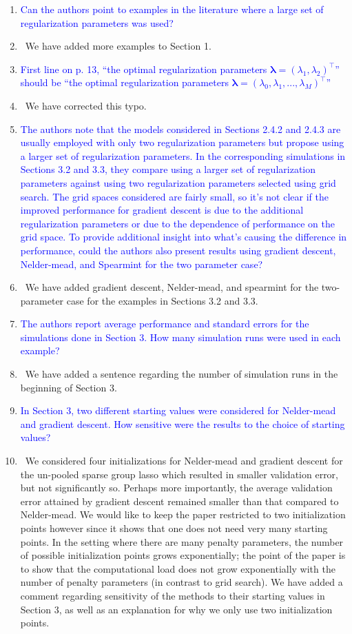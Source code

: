 \documentclass[]{article}
\newcommand{\point}[1]{\item \textcolor{blue}{#1}}
\newcommand{\reply}{\item[]\ }
\begin{document}
	\begin{enumerate}
		\point{Can the authors point to examples in the literature where a large set of regularization parameters was used?}
		
		\reply We have added more examples to Section 1.
		
		\point{First line on p. 13, ``the optimal regularization parameters $\boldsymbol{\lambda} = (\lambda_1,\lambda_2)^\top$'' should be ``the optimal regularization parameters $\boldsymbol{\lambda} = (\lambda_0, \lambda_1, ... , \lambda_M)^\top$''}
		
		\reply We have corrected this typo.
		
		\point{The authors note that the models considered in Sections 2.4.2 and 2.4.3 are usually employed with only two regularization parameters but propose using a larger set of regularization parameters. In the corresponding simulations in Sections 3.2 and 3.3, they compare using a larger set of regularization parameters against using two regularization parameters selected using grid search. The grid spaces considered are fairly small, so it’s not clear if the improved performance for gradient descent is due to the additional regularization parameters or due to the dependence of performance on the grid space. To provide additional insight into what’s causing the difference in performance, could the authors also present results using gradient descent, Nelder-mead, and Spearmint for the two parameter case?}
		
		\reply We have added gradient descent, Nelder-mead, and spearmint for the two-parameter case for the examples in Sections 3.2 and 3.3.
		
		\point{The authors report average performance and standard errors for the simulations done in Section 3. How many simulation runs were used in each example?}
		
		\reply We have added a sentence regarding the number of simulation runs in the beginning of Section 3.
		
		\point{In Section 3, two different starting values were considered for Nelder-mead and gradient descent. How sensitive were the results to the choice of starting values?}
		
		\reply We considered four initializations for Nelder-mead and gradient descent for the un-pooled sparse group lasso which resulted in smaller validation error, but not significantly so. Perhaps more importantly, the average validation error attained by gradient descent remained smaller than that compared to Nelder-mead. We would like to keep the paper restricted to two initialization points however since it shows that one does not need very many starting points. In the setting where there are many penalty parameters, the number of possible initialization points grows exponentially; the point of the paper is to show that the computational load does not grow exponentially with the number of penalty parameters (in contrast to grid search). We have added a comment regarding sensitivity of the methods to their starting values in Section 3, as well as an explanation for why we only use two initialization points.
		

\end{enumerate}
\end{document}
